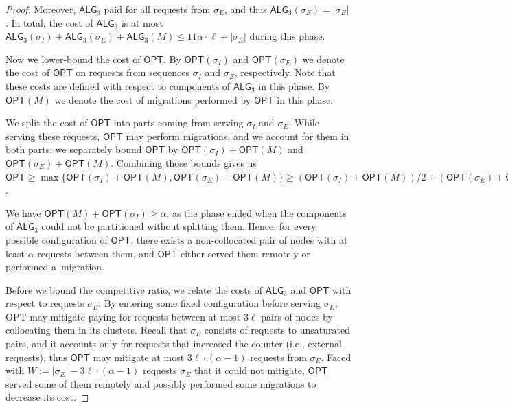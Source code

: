 \documentclass[manuscript,screen=true, review, anonymous]{acmart}
\newcommand{\OPT}{\textsf{OPT}\xspace}
\newcommand{\TAlg}{{\ensuremath{\textsf{ALG}_{3}}}\xspace}
\newcommand\maciek[1]{}
\begin{document}
\begin{proof}
	
	Moreover, \TAlg paid for all requests from $\sigma_E$, and thus $\TAlg(\sigma_E) = |\sigma_E|$.
	In total, the cost of \TAlg is at most $\TAlg(\sigma_I) + \TAlg(\sigma_E) + \TAlg(M) \leq 11\alpha\cdot \ell + |\sigma_E|$ during this phase.
	
	\medskip
	
	Now we lower-bound the cost of $\OPT$.
	By $\OPT(\sigma_I)$ and $\OPT(\sigma_E)$ we denote the cost of $\OPT$ on requests from sequences $\sigma_I$ and $\sigma_E$, respectively.
	Note that these costs are defined with respect to components of \TAlg in this phase.
	By $\OPT(M)$ we denote the cost of migrations performed by $\OPT$ in this phase.
	
	We split the cost of $\OPT$ into parts coming from serving $\sigma_I$ and $\sigma_E$.
	While serving these requests, $\OPT$ may perform migrations, and we account for them in both parts: we separately bound $\OPT$ by $\OPT(\sigma_I) + \OPT(M)$ and $\OPT(\sigma_E) + \OPT(M)$.
	Combining those bounds gives us $\OPT \geq \max\{\OPT(\sigma_I) + \OPT(M), \OPT(\sigma_E) + \OPT(M)\} \geq (\OPT(\sigma_I) + \OPT(M)) / 2 + (\OPT(\sigma_E) + \OPT(M)) / 2$.
	
	
	We have $\OPT(M) + \OPT(\sigma_I) \geq \alpha$, as the phase ended when the components of \TAlg{} could not be partitioned without splitting them.
	Hence, for every possible configuration of $\OPT$, there exists a non-collocated pair of nodes with at least $\alpha$ requests between them, and
	$\OPT$ either served them remotely or performed a~migration.
	
	\medskip
	Before we bound the competitive ratio, we relate the costs of $\TAlg$ and $\OPT$ with respect to requests $\sigma_E$.
	By entering some fixed configuration before serving $\sigma_E$, \OPT may mitigate paying for requests between at most $3\ell$ pairs of nodes by collocating them in its clusters.
	Recall that $\sigma_E$ consists of requests to unsaturated pairs, and it accounts only for requests that increased the counter (i.e., external requests), thus $\OPT$ may mitigate at most $3\ell\cdot(\alpha - 1)$ requests from $\sigma_E$.
	Faced with $W := |\sigma_E| - 3\ell\cdot(\alpha-1)$ requests $\sigma_E$ that it could not mitigate, $\OPT$ served some of them remotely and possibly performed some migrations to decrease its cost.
	

\end{proof}
\end{document}
